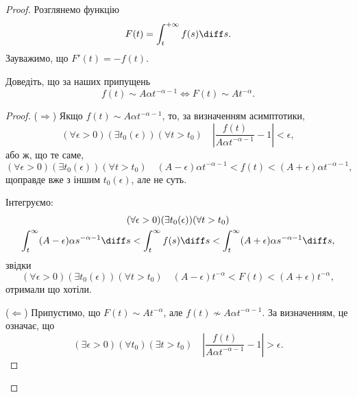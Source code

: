 \begin{proof}
    Розглянемо функцію 
    \begin{equation}
        F(t) = \int_t^{+\infty} f(s) \diff s.
    \end{equation}
    Зауважимо, що $F'(t) = -f(t)$.

    \begin{exercise}
        Доведіть, що за наших припущень
        \begin{equation}
            f(t) \sim A \alpha t^{-\alpha - 1} \iff F(t) \sim A t^{-\alpha}.
        \end{equation}
    \end{exercise}
    \begin{proof}
        ($\Longrightarrow$) Якщо $f(t) \sim A \alpha t^{-\alpha - 1}$, то, за визначенням асимптотики, 
            \begin{equation}
                (\forall \epsilon > 0) (\exists t_0(\epsilon)) (\forall t > t_0) \quad \left| \frac{f(t)}{A \alpha t^{-\alpha - 1}} - 1 \right| < \epsilon,
            \end{equation}
            або ж, що те саме,
            \begin{equation}
                (\forall \epsilon > 0) (\exists t_0(\epsilon)) (\forall t > t_0) \quad (A - \epsilon) \alpha t^{-\alpha - 1} < f(t) < (A + \epsilon) \alpha t^{-\alpha - 1},
            \end{equation}
            щоправде вже з іншим $t_0(\epsilon)$, але не суть. \medskip
            
            Інтегруємо:
            \begin{multline}
                (\forall \epsilon > 0) (\exists t_0(\epsilon)) (\forall t > t_0) \\ \int_t^\infty (A - \epsilon) \alpha s^{-\alpha - 1} \diff s < \int_t^\infty f(s) \diff s < \int_t^\infty (A + \epsilon) \alpha s^{-\alpha - 1} \diff s,
            \end{multline}
            звідки
            \begin{equation}
                (\forall \epsilon > 0) (\exists t_0(\epsilon)) (\forall t > t_0) \quad (A - \epsilon) t^{-\alpha} < F(t) < (A + \epsilon) t^{-\alpha},
            \end{equation}
            отримали що хотіли. \medskip
            
        ($\Longleftarrow$) Припустимо, що $F(t) \sim A t^{-\alpha}$, але $f(t) \not\sim A \alpha t^{-\alpha - 1}$. За визначенням, це означає, що  
        \begin{equation}
            (\exists \epsilon > 0) (\forall t_0) (\exists t > t_0) \quad \left| \frac{f(t)}{A \alpha t^{-\alpha - 1}} - 1 \right| > \epsilon.
        \end{equation}
        

\end{proof}
\end{proof}
